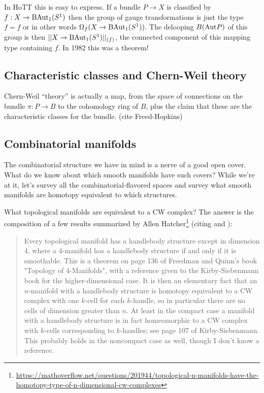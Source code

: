 \documentclass[12pt]{article}
\begin{document}
In HoTT this is easy to express. If a bundle \( P\to X \) is classified by \( f:X\to\mathrm{BAut}_1(S^1) \) then the group of gauge transformations is just the type \( f=f \) or in other words \( \Omega_f(X\to\mathrm{BAut}_1(S^1)) \). The delooping \( B(\mathrm{Aut} P) \) of this group is then \( ||X\to\mathrm{BAut}_1(S^1)||_{(f)} \), the connected component of this mapping type containing \( f \). In 1982 this was a theorem!\cite{atiyah1983yang}

\subsection{Characteristic classes and Chern-Weil theory}

Chern-Weil ``theory'' is actually a map, from the space of connections on the bundle \( \pi:P\to B \) to the cohomology ring of \( B \), plus the claim that these are the characteristic classes for the bundle. (cite Freed-Hopkins\cite{freed2013chernweil})

\subsection{Combinatorial manifolds}

The combinatorial structure we have in mind is a nerve of a good open cover. What do we know about which smooth manifolds have such covers? While we're at it, let's survey all the combinatorial-flavored spaces and survey what smooth manifolds are homotopy equivalent to which structures.

What topological manifolds are equivalent to a CW complex? The answer is the composition of a few results summarized by Allen Hatcher\footnote{\url{https://mathoverflow.net/questions/201944/topological-n-manifolds-have-the-homotopy-type-of-n-dimensional-cw-complexes}} (citing \cite{kirby_siebenmann} and \cite{freedman_quinn}):

\begin{quote}
Every topological manifold has a handlebody structure except in dimension 4, where a 4-manifold has a handlebody structure if and only if it is smoothable. This is a theorem on page 136 of Freedman and Quinn's book "Topology of 4-Manifolds", with a reference given to the Kirby-Siebenmann book for the higher-dimensional case. It is then an elementary fact that an \( n \)-manifold with a handlebody structure is homotopy equivalent to a CW complex with one \( k \)-cell for each \( k \)-handle, so in particular there are no cells of dimension greater than \( n \). At least in the compact case a manifold with a handlebody structure is in fact homeomorphic to a CW complex with \( k \)-cells corresponding to \( k \)-handles; see page 107 of Kirby-Siebenmann. This probably holds in the noncompact case as well, though I don't know a reference.
\end{quote}


\end{document}
